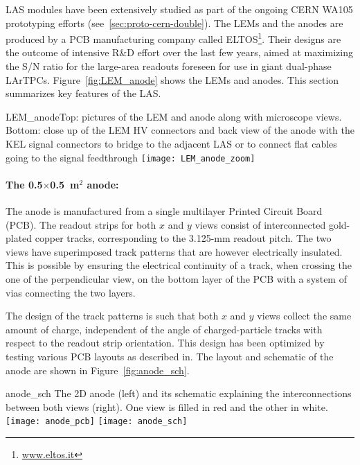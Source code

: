 LAS modules have been extensively studied as part of the ongoing CERN
WA105 prototyping efforts (see~\ref{sec:proto-cern-double}). The LEMs
and the anodes are produced by a PCB manufacturing company called
ELTOS\footnote{\url{www.eltos.it}}. Their designs are the outcome of
intensive R\&D effort over the last few years, aimed at maximizing the
S/N ratio for the large-area readouts foreseen for use in giant
dual-phase LArTPCs.  Figure~\ref{fig:LEM_anode} shows the LEMs and
anodes.  This section summarizes key features of the LAS.
\begin{cdrfigure}
{LEM_anode}{Top: pictures of the LEM and anode along with microscope
  views. Bottom: close up of the LEM HV connectors and back view of the anode 
with the KEL signal connectors to bridge to the adjacent LAS or to connect 
flat cables going to the signal feedthrough}
 \texttt{[image: LEM\_anode\_zoom]}  
 \end{cdrfigure}


 \paragraph{The 0.5$\times$0.5~m$^2$ anode:}

The anode is manufactured from a single multilayer Printed Circuit
Board (PCB). The readout strips for both $x$ and $y$ views consist of
interconnected gold-plated copper tracks, corresponding to the
3.125-mm readout pitch. The two views have superimposed track patterns
that are however electrically insulated. This is possible by ensuring
the electrical continuity of a track, when crossing the one of the
perpendicular view, on the bottom layer of the PCB with a system of
vias connecting the two layers.

The design of the track patterns is such that both $x$ and $y$ views
collect the same amount of charge, independent of the angle of
charged-particle tracks with respect to the readout strip
orientation. This design has been optimized by testing various PCB
layouts as described in\cite{Cantini:2013yba}.  The layout and
schematic of the anode are shown in Figure~\ref{fig:anode_sch}.
\begin{cdrfigure}{anode_sch}
{The 2D anode (left) and its schematic explaining the  interconnections 
between both views (right). One view is filled  in red and the other in white.}
\texttt{[image: anode\_pcb]} \hspace{0.2cm} \texttt{[image: anode\_sch]}
\end{cdrfigure}

